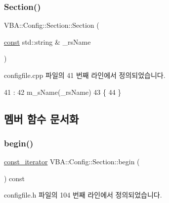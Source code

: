 \subsubsection{\texorpdfstring{Section()}{Section()}}
{\footnotesize\ttfamily V\+B\+A\+::\+Config\+::\+Section\+::\+Section (\begin{DoxyParamCaption}\item[{\mbox{\hyperlink{getopt1_8c_a2c212835823e3c54a8ab6d95c652660e}{const}} std\+::string \&}]{\+\_\+rs\+Name }\end{DoxyParamCaption})\hspace{0.3cm}{\ttfamily [explicit]}}



configfile.\+cpp 파일의 41 번째 라인에서 정의되었습니다.


\begin{DoxyCode}
41                                        :
42   m\_sName(\_rsName)
43 \{
44 \}
\end{DoxyCode}


\subsection{멤버 함수 문서화}
\mbox{\label{class_v_b_a_1_1_config_1_1_section_ac345183b43a45fd3eeaa646eac631390}} 
\subsubsection{\texorpdfstring{begin()}{begin()}}
{\footnotesize\ttfamily \mbox{\hyperlink{class_v_b_a_1_1_config_1_1_section_a79d4303068448425b08175c0d2dacfab}{const\+\_\+iterator}} V\+B\+A\+::\+Config\+::\+Section\+::begin (\begin{DoxyParamCaption}{ }\end{DoxyParamCaption}) const\hspace{0.3cm}{\ttfamily [inline]}}



configfile.\+h 파일의 104 번째 라인에서 정의되었습니다.


